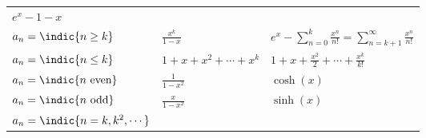 \begin{longtable}[]{@{}lll@{}}
\begin{minipage}[t]{0.30\columnwidth}
\(e^x - 1 - x\)\strut
\end{minipage}\tabularnewline
\begin{minipage}[t]{0.30\columnwidth}\raggedright
\(a_n = \indic{n \geq k}\)\strut
\end{minipage} & \begin{minipage}[t]{0.30\columnwidth}\raggedright
\(\frac {x^k} {1-x}\)\strut
\end{minipage} & \begin{minipage}[t]{0.30\columnwidth}\raggedright
\(e^x - \displaystyle\sum_{n=0}^k \frac{x^n}{n!} =\displaystyle\sum_{n=k+1}^\infty \frac{x^n}{n!}\)\strut
\end{minipage}\tabularnewline
\begin{minipage}[t]{0.30\columnwidth}\raggedright
\(a_n = \indic{n \leq k}\)\strut
\end{minipage} & \begin{minipage}[t]{0.30\columnwidth}\raggedright
\(1+x+x^2+\cdots +x^k\)\strut
\end{minipage} & \begin{minipage}[t]{0.30\columnwidth}\raggedright
\(1 + x + \frac{x^2}{2} + \cdots +\frac{x^k}{k!}\)\strut
\end{minipage}\tabularnewline
\begin{minipage}[t]{0.30\columnwidth}\raggedright
\(a_n = \indic{n\text{ even}}\)\strut
\end{minipage} & \begin{minipage}[t]{0.30\columnwidth}\raggedright
\(\frac{1}{1-x^2}\)\strut
\end{minipage} & \begin{minipage}[t]{0.30\columnwidth}\raggedright
\(\cosh(x)\)\strut
\end{minipage}\tabularnewline
\begin{minipage}[t]{0.30\columnwidth}\raggedright
\(a_n = \indic{n\text{ odd}}\)\strut
\end{minipage} & \begin{minipage}[t]{0.30\columnwidth}\raggedright
\(\frac{x}{1-x^2}\)\strut
\end{minipage} & \begin{minipage}[t]{0.30\columnwidth}\raggedright
\(\sinh(x)\)\strut
\end{minipage}\tabularnewline
\begin{minipage}[t]{0.30\columnwidth}\raggedright
\(a_n = \indic{n = k, k^2, \cdots}\)\strut
\end{minipage} & \begin{minipage}[t]{0.30\columnwidth}\raggedright

\end{minipage}
\end{longtable}
